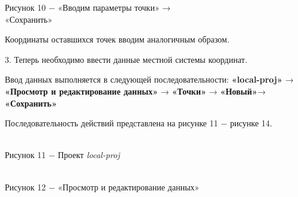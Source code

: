 \documentclass[a4paper]{article}
\begin{document}
{\begin{center}
    Рисунок 10 $-$ «Вводим параметры точки» → \\«Сохранить»
\end{center}
\par Координаты оставшихся точек вводим аналогичным образом.
\par 3. Теперь необходимо ввести данные местной системы координат. 
\par  Ввод данных выполняется в следующей последовательности: \textbf{«local-proj»} → \textbf{«Просмотр и редактирование данных»} → \textbf{«Точки»} → \textbf{«Новый»}→ \textbf{«Сохранить»}
\par Последовательность действий представлена на рисунке 11 $-$ рисунке 14.
\begin{center}
    \\
    Рисунок 11 $-$ Проект \textit{local-proj} 
\end{center}
\begin{center}
     \\
    Рисунок 12 $-$ «Просмотр и редактирование данных» 
\end{center}
\begin{center}
    \\

\end{center}}
\end{document}
